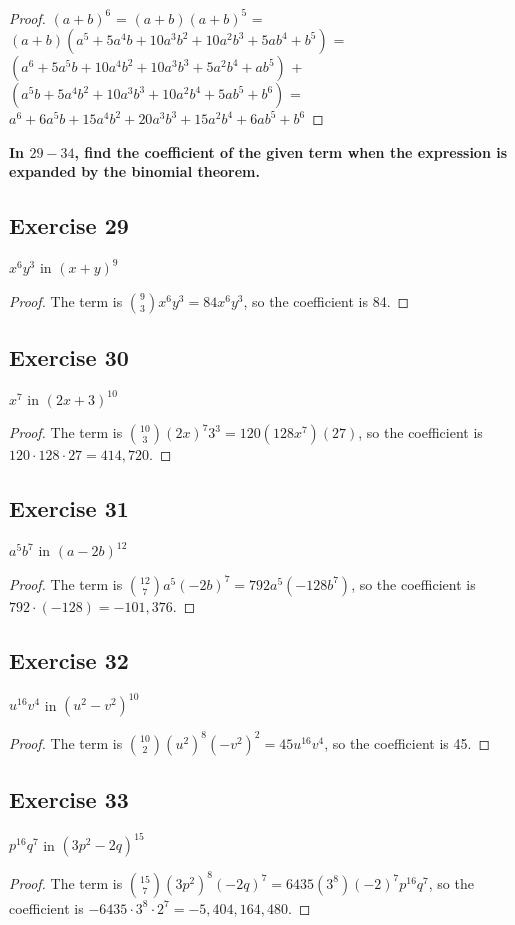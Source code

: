 \documentclass[14pt]{extarticle}
\newcommand{\dps}{\displaystyle}
\newcommand{\cy}{\color{cyan}}
\begin{document}
\begin{proof}
     \((a + b)^6\) = \((a + b)(a + b)^5\) = \((a+b)(a^5 + 5a^4b + 10a^3b^2 + 10a^2b^3 + 5ab^4 + b^5)\) = \((a^6 + 5a^5b +
     10a^4b^2 + 10a^3b^3 + 5a^2b^4 + ab^5)\) + \((a^5b + 5a^4b^2 + 10a^3b^3 + 10a^2b^4 + 5ab^5 + b^6)\) = \(a^6 + 6a^5b + 15a^4b^2 + 20a^3b^3 + 15a^2b^4 + 6ab^5 + b^6\)
\end{proof}

{\bf \cy In \(29-34\), find the coefficient of the given term when the expression is expanded by the binomial theorem.}

\subsection{Exercise 29}
\(x^6y^3\) in \((x+y)^9\)
\begin{proof}
     The term is \(\binom{9}{3}x^6y^3 = 84x^6y^3\), so the coefficient is 84.
\end{proof}

\subsection{Exercise 30}
\(x^7\) in \((2x+3)^{10}\)
\begin{proof}
     The term is \(\binom{10}{3}(2x)^7 3^3 = 120(128x^7)(27)\), so the coefficient is \(120 \cdot 128 \cdot 27 = 414,720\).
\end{proof}

\subsection{Exercise 31}
\(a^5b^7\) in \((a-2b)^{12}\)
\begin{proof}
     The term is \(\dps \binom{12}{7}a^5(-2b)^7 = 792a^5(-128b^7)\), so the coefficient is \(792 \cdot (-128) = -101,376\).
\end{proof}

\subsection{Exercise 32}
\(u^{16}v^4\) in \((u^2-v^2)^{10}\)
\begin{proof}
     The term is \(\dps \binom{10}{2}(u^2)^8(-v^2)^2 = 45u^{16}v^4\), so the coefficient is 45.
\end{proof}

\subsection{Exercise 33}
\(p^{16}q^7\) in \((3p^2-2q)^{15}\)
\begin{proof}
     The term is \(\dps \binom{15}{7}(3p^2)^8(-2q)^7 = 6435(3^8)(-2)^7p^{16}q^7\), so the coefficient is \(-6435 \cdot 3^8
     \cdot 2^7 = -5,404,164,480\).
\end{proof}
\end{document}
